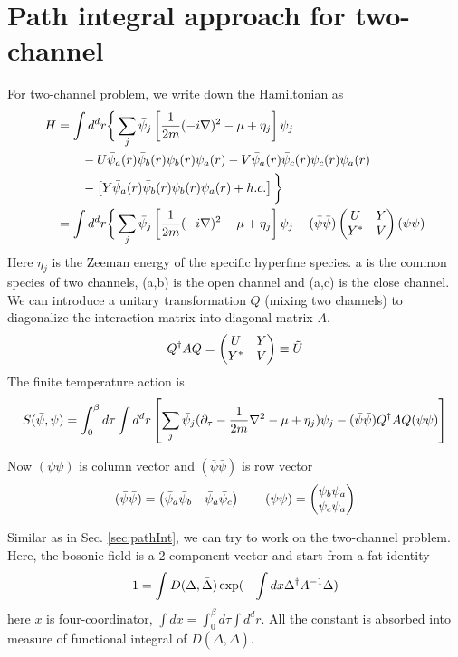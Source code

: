 
\chapter{Path integral approach for two-channel}
For two-channel problem, we write down the Hamiltonian as
\begin{equation}
\begin{split}
H&=\int{d^{d}r}\bigg\{\sum_{j}\bar\psi_{j}\left[\frac{1}{2m}(-i\nabla)^{2}-\mu+\eta_{j}\right]\psi_{j}\\
	&\qquad-U\bar\psi_{a}(r)\bar\psi_{b}(r)\psi_{b}(r)\psi_{a}(r)-V\bar\psi_{a}(r)\bar\psi_{c}(r)\psi_{c}(r)\psi_{a}(r)\\
	&\qquad-\left[Y\bar\psi_{a}(r)\bar\psi_{b}(r)\psi_{b}(r)\psi_{a}(r)+h.c.\right]
	\bigg\}\\
 &=\int{d^{d}r}\bigg\{\sum_{j}\bar\psi_{j}\left[\frac{1}{2m}(-i\nabla)^{2}-\mu+\eta_{j}\right]\psi_{j}
 	-(\bar\psi\bar\psi)\begin{pmatrix}U&Y\\Y^{*}&V\end{pmatrix}(\psi\psi)
\end{split}
\end{equation}
Here $\eta_{j}$ is the Zeeman energy of the specific hyperfine species.  a is the common species of two channels, (a,b) is the open channel and (a,c) is the close channel.  We can introduce a unitary transformation $Q$ (mixing two channels) to diagonalize the interaction matrix into diagonal matrix $A$.
\begin{equation}
Q^{\dagger}AQ=\begin{pmatrix}U&Y\\Y^{*}&V\end{pmatrix}\equiv{}\tilde{U}
\end{equation}
The finite temperature action is 
\begin{equation}\label{eq:pathInt2:actionFermi}
S(\bar\psi,\psi)=\int^{\beta}_{0}d\tau\int{d^{d}r}\left[\sum_{j}\bar\psi_{j}(\partial_\tau-\frac{1}{2m}\nabla^{2}-\mu+\eta_{j})\psi_{j}
-(\bar\psi\bar\psi)Q^{\dagger}AQ(\psi\psi)\right]
\end{equation}

Now $(\psi\psi)$ is column vector and $(\bar\psi\bar\psi)$ is row vector
\begin{equation*}
(\bar\psi\bar\psi)=\begin{pmatrix}\bar\psi_{a}\bar\psi_{b}&\bar\psi_{a}\bar\psi_{c}\end{pmatrix}
\qquad(\psi\psi)=\begin{pmatrix}\psi_{b}\psi_{a}\\\psi_{c}\psi_{a}\end{pmatrix}
\end{equation*}

Similar as in Sec. \ref{sec:pathInt}, we can try to work on the two-channel problem.  Here, the bosonic field is a 2-component vector   and start from a fat identity
\begin{equation}\label{eq:pathInt2:indetity}
1=\int{D(\Delta,\bar\Delta)}\exp(-\int{dx}\Delta^{\dagger}A^{-1}\Delta)
\end{equation}
here $x$ is four-coordinator,  $\int{dx}=\int^{\beta}_{0}d\tau\int{d^{d}r}$.  All the constant is absorbed into measure of functional integral of $D(\Delta,\bar\Delta)$.

